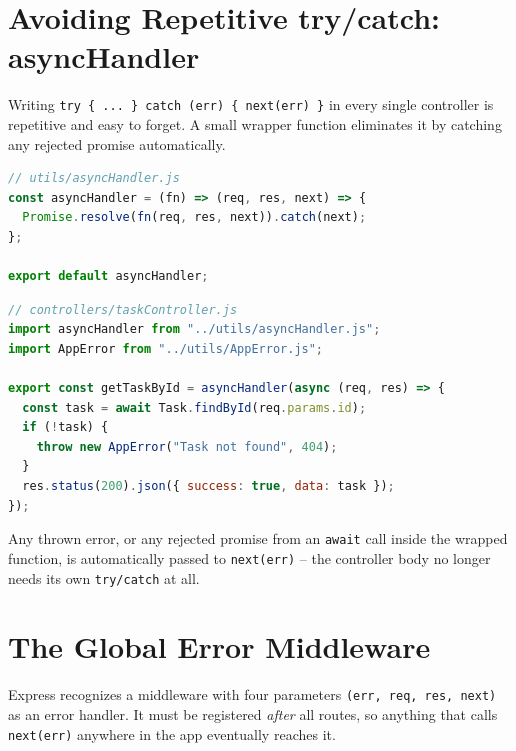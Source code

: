 \section{Avoiding Repetitive try/catch: asyncHandler}

Writing \texttt{try \{ ... \} catch (err) \{ next(err) \}} in every single
controller is repetitive and easy to forget. A small wrapper function
eliminates it by catching any rejected promise automatically.

\begin{lstlisting}[language=JavaScript]
// utils/asyncHandler.js
const asyncHandler = (fn) => (req, res, next) => {
  Promise.resolve(fn(req, res, next)).catch(next);
};

export default asyncHandler;
\end{lstlisting}

\begin{lstlisting}[language=JavaScript]
// controllers/taskController.js
import asyncHandler from "../utils/asyncHandler.js";
import AppError from "../utils/AppError.js";

export const getTaskById = asyncHandler(async (req, res) => {
  const task = await Task.findById(req.params.id);
  if (!task) {
    throw new AppError("Task not found", 404);
  }
  res.status(200).json({ success: true, data: task });
});
\end{lstlisting}

Any thrown error, or any rejected promise from an \texttt{await} call inside
the wrapped function, is automatically passed to \texttt{next(err)} -- the
controller body no longer needs its own \texttt{try/catch} at all.

\section{The Global Error Middleware}

Express recognizes a middleware with four parameters
\texttt{(err, req, res, next)} as an error handler. It must be registered
\emph{after} all routes, so anything that calls \texttt{next(err)} anywhere
in the app eventually reaches it.

